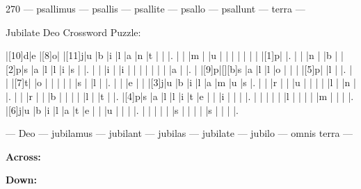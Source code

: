 \documentclass[12pt]{article}
\begin{document}
\pagestyle{fancy}
\fancyhf{}
\renewcommand{\headrulewidth}{0pt}
\renewcommand{\footrulewidth}{0pt}
\libertine
\renewcommand\PuzzleClueFont{\rm\normalsize}
\noindent\begin{rotate}{0}
\small
\end{rotate}
\hfill
\begin{rotate}{270}
\qquad \qquad \small --- psallimus --- psallis --- psallite --- psallo --- psallunt --- terra --- 

\end{rotate}
\begin{center}
  \huge{Jubilate Deo Crossword Puzzle:}
\end{center}
\vspace{1.5cm}
\begin{Puzzle}{15}{15}
  |[10]d|e   |[8]o|{}  |[11]j|u   |b   |i   |l   |a   |n   |t   |{}  |{}  |.
  |{}  |{}  |m   |{}  |u   |{}  |{}  |{}  |{}  |{}  |{}  |{}  |[1]p|{}  |.
  |{}  |{}  |n   |{}  |b   |{}  |[2]p|s   |a   |l   |l   |i   |s   |{}  |.
  |{}  |{}  |i   |{}  |i   |{}  |{}  |{}  |{}  |{}  |{}  |{}  |a   |{}  |.
  |{}  |[9]p|[][b]s   |a   |l   |l   |o   |{}  |{}  |{}  |[5]p|{}  |l   |{}  |.
  |{}  |{}  |[7]t|{}  |o   |{}  |{}  |{}  |{}  |{}  |s   |{}  |l   |{}  |.
  |{}  |{}  |e   |{}  |{}  |[3]j|u   |b   |i   |l   |a   |m   |u   |s   |.
  |{}  |{}  |r   |{}  |{}  |u   |{}  |{}  |{}  |{}  |l   |{}  |n   |{}  |.
  |{}  |{}  |r   |{}  |{}  |b   |{}  |{}  |{}  |{}  |l   |{}  |t   |{}  |.
  |[4]p|s   |a   |l   |l   |i   |t   |e   |{}  |{}  |i   |{}  |{}  |{}  |.
  |{}  |{}  |{}  |{}  |{}  |l   |{}  |{}  |{}  |{}  |m   |{}  |{}  |{}  |.
  |[6]j|u   |b   |i   |l   |a   |t   |e   |{}  |{}  |u   |{}  |{}  |{}  |.
  |{}  |{}  |{}  |{}  |{}  |s   |{}  |{}  |{}  |{}  |s   |{}  |{}  |{}  |.
\end{Puzzle}
\begin{rotate}{90}
\small 
\qquad --- Deo --- jubilamus --- jubilant --- jubilas --- jubilate --- jubilo --- omnis terra --- \end{rotate}
\hspace{-10pt}
\begin{PuzzleClues}{\textbf{Across:}}
\end{PuzzleClues}
\begin{PuzzleClues}{\textbf{Down:}}
\end{PuzzleClues}
\end{document}
